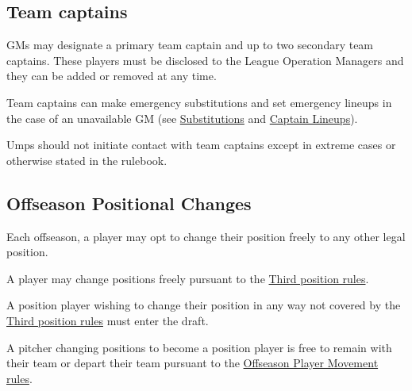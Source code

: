 \subsection{Team captains}
\begin{deepEnumerate}
	\item GMs may designate a primary team captain and up to two secondary team captains.
	These players must be disclosed to the League Operation Managers and they can be added or removed at any time.
	\item Team captains can make emergency substitutions and set emergency lineups in the case of an unavailable GM
	(see \hyperref[sec:substitutions]{Substitutions} and \hyperref[sec:captain lineups]{Captain Lineups}).
	\begin{deepEnumerate}
		\item Umps should not initiate contact with team captains except in extreme cases or otherwise stated in the rulebook.
	\end{deepEnumerate}
\end{deepEnumerate}

\subsection{Offseason Positional Changes}
\label{sec:OPC}
\begin{deepEnumerate}
	\item Each offseason, a player may opt to change their position freely to any other legal position.
	\item A player may change positions freely pursuant to the \hyperref[sec:Third position]{Third position rules}.
	\item A position player wishing to change their position in any way not covered by the \hyperref[sec:Third position]{Third position rules} must enter the draft.
	\item A pitcher changing positions to become a position player is free to remain with their team or depart their team pursuant to the
	\hyperref[sec:OPM]{Offseason Player Movement rules}.
\end{deepEnumerate}

